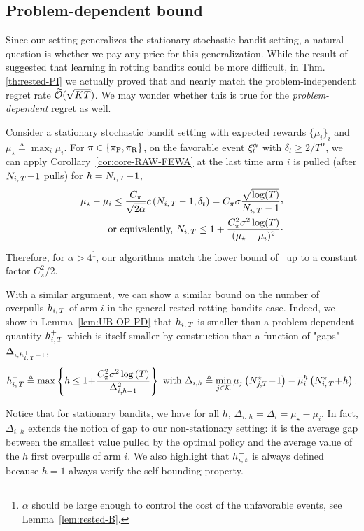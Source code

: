 \subsection{Problem-dependent bound}
\label{ss:rested-PD}
Since our setting generalizes the stationary stochastic bandit setting, a natural question is whether we pay any price for this generalization. While the result of~\citet{levine2017rotting} suggested that learning in rotting bandits could be more difficult, in Thm.\,\ref{th:rested-PI} we actually proved that \FEWA and \RUCB nearly match the problem-independent regret rate $\widetilde{\mathcal{O}}(\sqrt{KT})$. We may wonder whether this is true for the \emph{problem-dependent} regret as well.
%
\begin{remark}
Consider a stationary stochastic bandit setting with expected rewards $\{\mu_i\}_i $ and $\mu_\star \triangleq \max_i \mu_i$. For $\pi \in \left\{\pi_{\rm F}, \pi_{\rm R}\right\}$, on the favorable event $\xi^\alpha_t$ with $\delta_t \geq 2/T^\alpha$,  we can apply Corollary~\ref{cor:core-RAW-FEWA}  at the last time arm $i$ is pulled (\ie after $N_{i,\,T}\!-\!1$ pulls) for $h = N_{i,\,T}\!-\!1$, 
\begin{align}
\mu_\star - \mu_i \leq \frac{C_\pi}{\sqrt{2\alpha}} c\pa{\NiT-1,  \delta_t} = C_\pi\sigma \frac{\sqrt{\log(T)}}{\NiT -1} \CommaBin\nonumber \\
\text{\ or equivalently,\ }
\NiT \leq 1+ \frac{C_\pi^2 \sigma^2 \log(T)}{(\mu_{\star} - \mu_i) ^2}\cdot\label{eq:LaiRob}
\end{align}
Therefore, for $\alpha > 4$\footnote{$\alpha$ should be large enough to control the cost of the unfavorable events, see Lemma~\ref{lem:rested-B}.}, our algorithms match the lower bound of~\citet{lai1985asymptotically} up to a constant factor $C_\pi^2/2$.
\end{remark}
%
With a similar argument, we can show a similar bound on the number of overpulls $h_{i,\,T}$  of arm $i$ in the general rested rotting bandits case. Indeed, we show in Lemma~\ref{lem:UB-OP-PD} that $h_{i,\,T}$ is smaller than a problem-dependent quantity $h_{i,\,T}^+$ which is itself smaller by construction than a function of "gaps" $\Delta_{i,h_{i,\,T}^+-1}$,
%
\begin{equation}
\label{eq:hit+}
h_{i,\,T}^+ \triangleq \max \left\{ h \leq 
1 \! + \! \frac{C_\pi^2 \sigma^2 \log \left(T\right)}{\Delta_{i,h-1}^2} \right\}\text{ with  } \Delta_{i,h} \triangleq \min_{j \in \mathcal{K}} \mu_j\left(N_{j,T}^\star \!-\!1\right) - \overline{\mu}_i^h\left( N_{i,\,T}^\star \!+\!h \right). 
\end{equation}
\begin{remark}
Notice that for stationary bandits, we have for all $h$, $\Delta_{i,\,h} = \Delta_i = \mu_\star - \mu_i$. In fact, $ \Delta_{i,\,h} $ extends the notion of gap to our non-stationary setting: it is the average gap between the smallest value pulled by the optimal policy and the average value of the $h$ first overpulls of arm $i$.  We also highlight that $h_{i,\,t}^+$ is always defined because $h=1$ always verify the self-bounding property. 
\end{remark}

